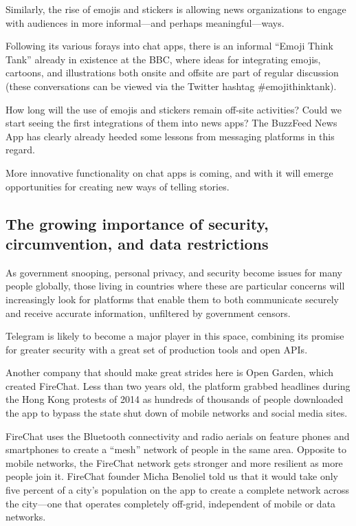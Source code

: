 \documentclass[notoc, symmetric, nobib, nols]{towcenter-guideto-book}
\begin{document}
Similarly, the rise of emojis and stickers is allowing news organizations to engage with audiences in more informal---and perhaps meaningful---ways. 

Following its various forays into chat apps, there is an informal ``Emoji Think Tank'' already in existence at the BBC, where ideas for integrating emojis, cartoons, and illustrations both onsite and offsite are part of regular discussion (these conversations can be viewed via the Twitter hashtag \#emojithinktank).

How long will the use of emojis and stickers remain off-site activities? Could we start seeing the first integrations of them into news apps? The BuzzFeed News App has clearly already heeded some lessons from messaging platforms in this regard.

More innovative functionality on chat apps is coming, and with it will emerge opportunities for creating new ways of telling stories.

\subsection{The growing importance of security, circumvention, and data restrictions}
As government snooping, personal privacy, and security become issues for many people globally, those living in countries where these are particular concerns will increasingly look for platforms that enable them to both communicate securely and receive accurate information, unfiltered by government censors. 

Telegram is likely to become a major player in this space, combining its promise for greater security with a great set of production tools and open APIs. 

Another company that should make great strides here is Open Garden, which created FireChat. Less than two years old, the platform grabbed headlines during the Hong Kong protests of 2014 as hundreds of thousands of people downloaded the app to bypass the state shut down of mobile networks and social media sites. 

FireChat uses the Bluetooth connectivity and radio aerials on feature phones and smartphones to create a ``mesh'' network of people in the same area. Opposite to mobile networks, the FireChat network gets stronger and more resilient as more people join it. FireChat founder Micha Benoliel told us that it would take only five percent of a city's population on the app to create a complete network across the city---one that operates completely off-grid, independent of mobile or data networks. 
\end{document}
